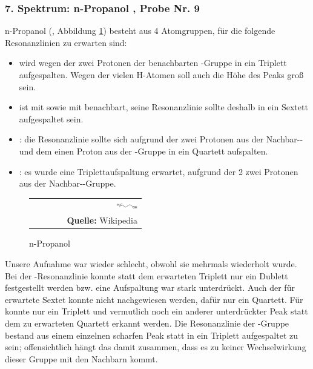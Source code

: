 \documentclass[a4paper,titlepage]{scrartcl}
\numberwithin{equation}{section}
\begin{document}
\subsubsection{7. Spektrum: n-Propanol , Probe Nr. 9}
n-Propanol (, Abbildung \ref{fig:npropanol}) besteht aus 4 Atomgruppen, für die folgende Resonanzlinien zu erwarten sind:
\begin{itemize}
\item {} wird wegen der zwei Protonen der benachbarten -Gruppe in ein Triplett aufgespalten. Wegen der vielen H-Atomen soll auch die Höhe des Peaks groß sein.
\item {} ist mit  sowie mit  benachbart, seine Resonanzlinie sollte deshalb in ein Sextett aufgespaltet sein.
\item {}: die Resonanzlinie sollte sich aufgrund der zwei Protonen aus der Nachbar-- und dem einen Proton aus der -Gruppe in ein Quartett aufspalten.
\item {}: es wurde eine Triplettaufspaltung erwartet, aufgrund der 2 zwei Protonen aus der Nachbar--Gruppe.
\end{itemize}
\begin{figure}[H]
	\centering
	\begin{tabular}{@{}r@{}}
		\includegraphics[width=0.2\textwidth]{images/npropanol.png}\\
	\footnotesize\sffamily\textbf{Quelle:} Wikipedia \cite{wiki:npropanol}
	\end{tabular}
	\caption{n-Propanol }
    \label{fig:npropanol}
\end{figure}
Unsere Aufnahme war wieder schlecht, obwohl sie mehrmals wiederholt wurde. Bei der -Resonanzlinie konnte statt dem erwarteten Triplett nur ein Dublett festgestellt werden bzw. eine Aufspaltung war stark unterdrückt. Auch der für  erwartete Sextet konnte nicht nachgewiesen werden, dafür nur ein Quartett. Für  konnte nur ein Triplett und vermutlich noch ein anderer unterdrückter Peak statt dem zu erwarteten Quartett erkannt werden. Die Resonanzlinie der -Gruppe bestand aus einem einzelnen scharfen Peak statt in ein Triplett aufgespaltet zu sein; offensichtlich hängt das damit zusammen, dass es zu keiner Wechselwirkung dieser Gruppe mit den Nachbarn kommt.\\ \\
\end{document}
